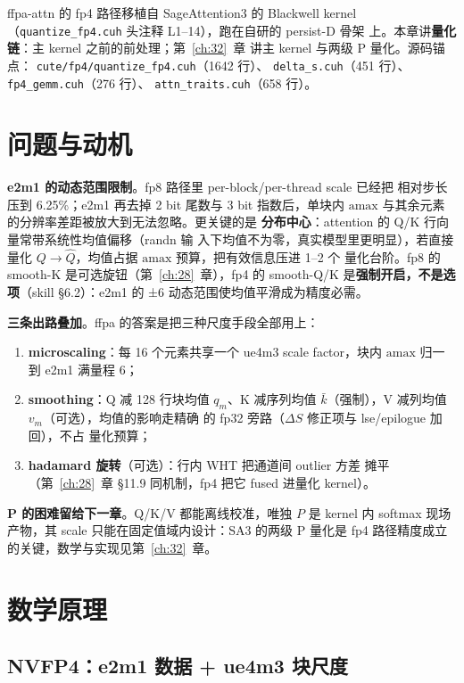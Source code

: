 ffpa-attn 的 fp4 路径移植自 SageAttention3 的 Blackwell kernel
（\texttt{quantize\_fp4.cuh} 头注释 L1--14），跑在自研的 persist-D 骨架
上。本章讲\textbf{量化链}：主 kernel 之前的前处理；第~\ref{ch:32}~章
讲主 kernel 与两级 P 量化。源码锚点：
\texttt{cute/fp4/quantize\_fp4.cuh}（1642 行）、
\texttt{delta\_s.cuh}（451 行）、\texttt{fp4\_gemm.cuh}（276 行）、
\texttt{attn\_traits.cuh}（658 行）。

\section{问题与动机}

\textbf{e2m1 的动态范围限制}。fp8 路径里 per-block/per-thread scale 已经把
相对步长压到 6.25\%；e2m1 再去掉 2 bit 尾数与 3 bit 指数后，单块内
$\mathrm{amax}$ 与其余元素的分辨率差距被放大到无法忽略。更关键的是
\textbf{分布中心}：attention 的 Q/K 行向量常带系统性均值偏移（randn 输
入下均值不为零，真实模型里更明显），若直接量化
$Q\to\hat Q$，均值占据 $\mathrm{amax}$ 预算，把有效信息压进 1--2 个
量化台阶。fp8 的 smooth-K 是可选旋钮（第~\ref{ch:28}~章），fp4 的
smooth-Q/K 是\textbf{强制开启，不是选项}（skill §6.2）：e2m1 的 ±6
动态范围使均值平滑成为精度必需。

\textbf{三条出路叠加}。ffpa 的答案是把三种尺度手段全部用上：
\begin{enumerate}[itemsep=0pt,topsep=2pt]
  \item \textbf{microscaling}：每 16 个元素共享一个 ue4m3 scale
        factor，块内 $\mathrm{amax}$ 归一到 e2m1 满量程 6；
  \item \textbf{smoothing}：Q 减 128 行块均值 $q_m$、K 减序列均值
        $\bar k$（强制），V 减列均值 $v_m$（可选），均值的影响走精确
        的 fp32 旁路（$\Delta S$ 修正项与 lse/epilogue 加回），不占
        量化预算；
  \item \textbf{hadamard 旋转}（可选）：行内 WHT 把通道间 outlier 方差
        摊平（第~\ref{ch:28}~章 §11.9 同机制，fp4 把它 fused 进量化
        kernel）。
\end{enumerate}

\textbf{P 的困难留给下一章}。Q/K/V 都能离线校准，唯独 $P$ 是 kernel 内
softmax 现场产物，其 scale 只能在固定值域内设计：SA3 的两级 P 量化是
fp4 路径精度成立的关键，数学与实现见第~\ref{ch:32}~章。

\section{数学原理}

\subsection{NVFP4：e2m1 数据 + ue4m3 块尺度}

